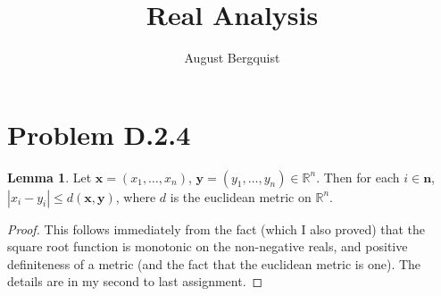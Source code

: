 \documentclass[11pt]{article}
\title{Real Analysis}
\author{August Bergquist}
\newcommand{\R}{\mathbb{R}}
\theoremstyle{definition}
\newtheorem{lemma}{Lemma}
\begin{document}
\maketitle

\section{Problem D.2.4}

\begin{lemma}
Let $\mathbf{x} = (x_1,\dots,x_n)$, $\mathbf{y} = (y_1,\dots, y_n)\in \R^n$. Then for each $i\in \mathbf{n}$, $|x_i-y_i| \le d(\mathbf{x},\mathbf{y})$, where $d$ is the euclidean metric on $\R^n$.
\end{lemma}
\begin{proof}
This follows immediately from the fact (which I also proved) that the square root function is monotonic on the non-negative reals, and positive definiteness of a metric (and the fact that the euclidean metric is one). The details are in my second to last assignment.
\end{proof}
\end{document}
